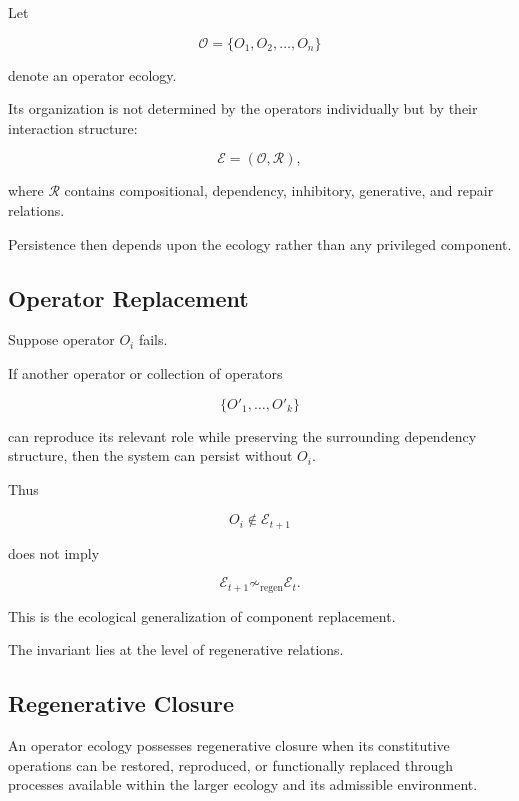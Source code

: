 \documentclass[11pt]{article}
\theoremstyle{remark}
\begin{document}
Let

\begin{equation}
\mathcal{O}
=
\{O_1,O_2,\ldots,O_n\}
\end{equation}

denote an operator ecology.

Its organization is not determined by the operators individually but by their interaction structure:

\begin{equation}
\mathcal{E}
=
(\mathcal{O},\mathcal{R}),
\end{equation}

where $\mathcal{R}$ contains compositional, dependency, inhibitory, generative, and repair relations.

Persistence then depends upon the ecology rather than any privileged component.

\subsection{Operator Replacement}

Suppose operator $O_i$ fails.

If another operator or collection of operators

\begin{equation}
\{O'_1,\ldots,O'_k\}
\end{equation}

can reproduce its relevant role while preserving the surrounding dependency structure, then the system can persist without $O_i$.

Thus

\begin{equation}
O_i
\notin
\mathcal{E}_{t+1}
\end{equation}

does not imply

\begin{equation}
\mathcal{E}_{t+1}
\not\sim_{\mathrm{regen}}
\mathcal{E}_t.
\end{equation}

This is the ecological generalization of component replacement.

The invariant lies at the level of regenerative relations.

\subsection{Regenerative Closure}

An operator ecology possesses regenerative closure when its constitutive operations can be restored, reproduced, or functionally replaced through processes available within the larger ecology and its admissible environment.
\end{document}
